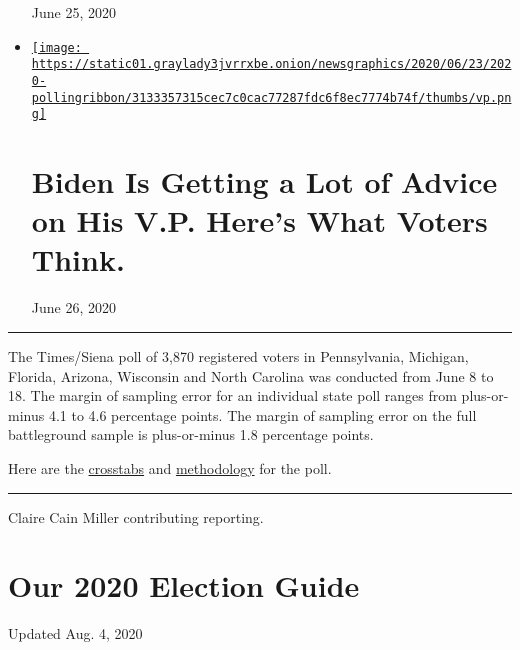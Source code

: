 \begin{itemize}
  June 25, 2020
\item
  \href{https://www.nytimes3xbfgragh.onion/2020/06/26/us/politics/biden-vice-president-voters.html}{\texttt{[image: https://static01.graylady3jvrrxbe.onion/newsgraphics/2020/06/23/2020-pollingribbon/3133357315cec7c0cac77287fdc6f8ec7774b74f/thumbs/vp.png]}}

  \href{https://www.nytimes3xbfgragh.onion/2020/06/26/us/politics/biden-vice-president-voters.html}{}

  \hypertarget{biden-is-getting-a-lot-of-advice-on-his-vp-heres-what-voters-think}{%
  \section{Biden Is Getting a Lot of Advice on His V.P. Here's What
  Voters
  Think.}\label{biden-is-getting-a-lot-of-advice-on-his-vp-heres-what-voters-think}}

  June 26, 2020
\end{itemize}

\begin{center}\rule{0.5\linewidth}{\linethickness}\end{center}

The Times/Siena poll of 3,870 registered voters in Pennsylvania,
Michigan, Florida, Arizona, Wisconsin and North Carolina was conducted
from June 8 to 18. The margin of sampling error for an individual state
poll ranges from plus-or-minus 4.1 to 4.6 percentage points. The margin
of sampling error on the full battleground sample is plus-or-minus 1.8
percentage points.

Here are the
\href{https://int.graylady3jvrrxbe.onion/data/documenttools/battleground-0625/6ca076db1919b722/full.pdf}{crosstabs}
and
\href{https://int.graylady3jvrrxbe.onion/data/documenttools/nyt-siena-poll-methodology-june-2020/f6f533b4d07f4cbe/full.pdf}{methodology}
for the poll.

\begin{center}\rule{0.5\linewidth}{\linethickness}\end{center}

Claire Cain Miller contributing reporting.

\hypertarget{our-2020-election-guide}{%
\section{Our 2020 Election Guide}\label{our-2020-election-guide}}

Updated Aug. 4, 2020


